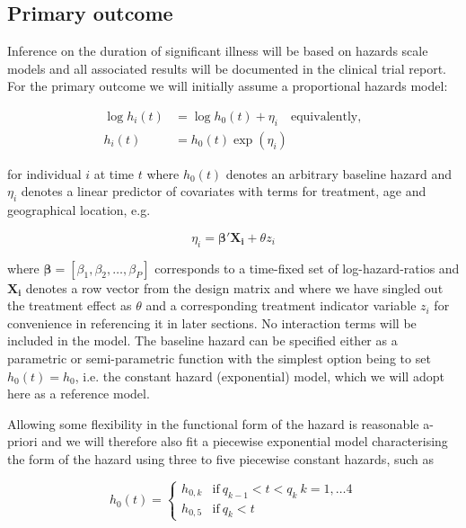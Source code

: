 \documentclass[a4paper]{article}
\begin{document}
\subsection{Primary outcome}

Inference on the duration of significant illness will be based on hazards scale models and all associated results will be documented in the clinical trial report.
For the primary outcome we will initially assume a proportional hazards model:

\begin{align*}
\log h_i(t) &= \log h_0(t) + \eta_i \quad \text{equivalently},  \\
h_i(t) &= h_0(t) \exp(\eta_i)
\end{align*}

for individual $i$ at time $t$ where $h_0(t)$ denotes an arbitrary baseline hazard and $\eta_i$ denotes a linear predictor of covariates with terms for treatment, age and geographical location, e.g.

\begin{equation}
\eta_i = \boldsymbol{\beta}' \boldsymbol{X_i} + \theta z_i
\end{equation}

where $\boldsymbol{\beta} = [\beta_1, \beta_2, \dots, \beta_P]$ corresponds to a time-fixed set of log-hazard-ratios and $\boldsymbol{X_i}$ denotes a row vector from the design matrix and where we have singled out the treatment effect as $\theta$ and a corresponding treatment indicator variable $z_i$ for convenience in referencing it in later sections.
No interaction terms will be included in the model.
The baseline hazard can be specified either as a parametric or semi-parametric function with the simplest option being to set $h_0(t) = h_0$, i.e. the constant hazard (exponential) model, which we will adopt here as a reference model.

Allowing some flexibility in the functional form of the hazard is reasonable a-priori and we will therefore also fit a piecewise exponential model characterising the form of the hazard using three to five piecewise constant hazards, such as

\begin{equation}
h_0(t) = \begin{cases}
      h_{0,k} & \text{if}\ q_{k-1} < t < q_k \ k = 1, \dots 4 \\
      h_{0,5} & \text{if}\ q_k < t
    \end{cases}
\end{equation}
\end{document}
